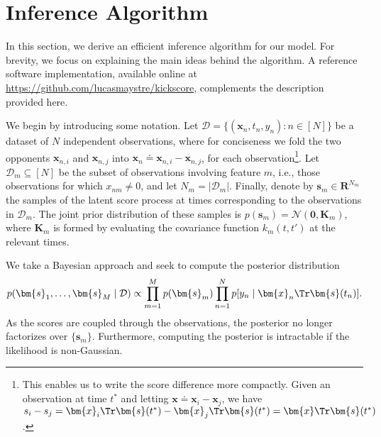 \section{Inference Algorithm}
\label{kks:sec:inference}

In this section, we derive an efficient inference algorithm for our model.
For brevity, we focus on explaining the main ideas behind the algorithm.
A reference software implementation, available online at \url{https://github.com/lucasmaystre/kickscore}, complements the description provided here.

We begin by introducing some notation.
Let $\mathcal{D} = \{ (\bm{x}_n, t_n, y_n) : n \in [N] \}$ be a dataset of $N$ independent observations, where for conciseness we fold the two opponents $\bm{x}_{n,i}$ and $\bm{x}_{n,j}$ into $\bm{x}_n \doteq \bm{x}_{n,i} - \bm{x}_{n,j}$, for each observation\footnote{%
This enables us to write the score difference more compactly.
Given an observation at time $t^*$ and letting $\bm{x} \doteq \bm{x}_i - \bm{x}_j$, we have $s_i - s_j = \bm{x}_i\Tr \bm{s}(t^*) - \bm{x}_j\Tr \bm{s}(t^*) = \bm{x}\Tr \bm{s}(t^*)$.
}.
Let $\mathcal{D}_m \subseteq [N]$ be the subset of observations involving feature $m$, i.e., those observations for which $x_{nm} \ne 0$, and let $N_m = \lvert \mathcal{D}_m \rvert$.
Finally, denote by $\bm{s}_m \in \mathbf{R}^{N_m}$ the samples of the latent score process at times corresponding to the observations in $\mathcal{D}_m$.
The joint prior distribution of these samples is $p(\bm{s}_m) = \mathcal{N}(\bm{0}, \bm{K}_m)$, where $\bm{K}_m$ is formed by evaluating the covariance function $k_m(t, t')$ at the relevant times.

We take a Bayesian approach and seek to compute the posterior distribution
\begin{align}
\label{kks:eq:truepost}
p(\bm{s}_1, \ldots, \bm{s}_M \mid \mathcal{D}) \propto \prod_{m = 1}^M p(\bm{s}_m) \prod_{n = 1}^N p[y_n \mid \bm{x}_n\Tr \bm{s}(t_n)].
\end{align}
As the scores are coupled through the observations, the posterior no longer factorizes over $\{ \bm{s}_m \}$.
Furthermore, computing the posterior is intractable if the likelihood is non-Gaussian.


